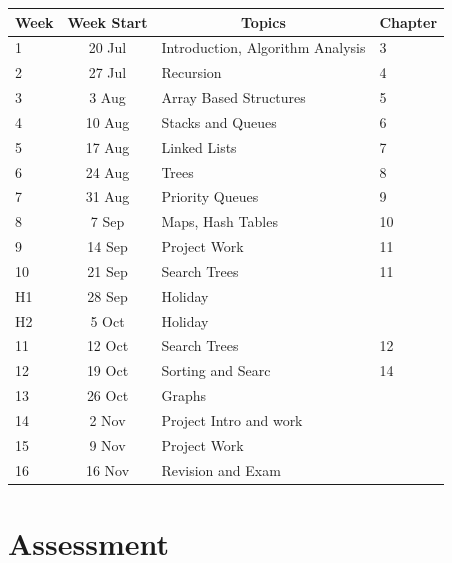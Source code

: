 \documentclass{article}
\begin{document}
\renewcommand{\arraystretch}{1.5}
\begin{tabular}{|l|c|l|l|}
\hline
 Week & Week Start & \multicolumn{1}{c|}{Topics}               & Chapter   \\ \hline
 1    & 20 Jul     & Introduction, Algorithm Analysis          &   3 \\ \hline
 2    & 27 Jul     & Recursion                                 &   4 \\ \hline
 3    &  3 Aug     & Array Based Structures                    &   5 \\ \hline
 4    & 10 Aug     & Stacks and Queues                         &   6 \\ \hline
 5    & 17 Aug     & Linked Lists                              &   7 \\ \hline
 6    & 24 Aug     & Trees                                     &   8\\ \hline
 7    & 31 Aug     & Priority Queues                           &   9\\ \hline
 8    &  7 Sep     & Maps, Hash Tables                         &   10 \\ \hline
 9    & 14 Sep     & Project Work                              &   11 \\ \hline
 10   & 21 Sep     & Search Trees                              &   11 \\ \hline
 H1   & 28 Sep     & Holiday                                   &    \\ \hline
 H2   &  5 Oct     & Holiday                                   &    \\ \hline
 11   & 12 Oct     & Search Trees                              &   12 \\ \hline
 12   & 19 Oct     & Sorting and Searc                         &   14 \\ \hline
 13   & 26 Oct     & Graphs                                    &   \\ \hline
 14   &  2 Nov     & Project Intro and work                    &   \\ \hline
 15   &  9 Nov     & Project Work                              &   \\ \hline
 16   & 16 Nov     & Revision and Exam                         &   \\ \hline
\end{tabular}

\section*{Assessment}
\end{document}
